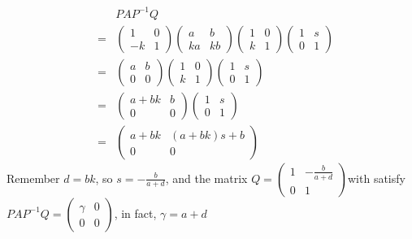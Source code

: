 \begin{eqnarray*}
  & & PAP^{-1}Q \\
  &=& \left(\begin{array}{cc}
    1 & 0 \\
    -k & 1
  \end{array}\right)\left(\begin{array}{cc}
    a & b \\
    ka & kb
  \end{array}\right)\left(\begin{array}{cc}
    1 & 0 \\
    k & 1
  \end{array}\right)\left(\begin{array}{cc}
    1 & s \\
    0 & 1
  \end{array}\right) \\
  &=& \left(\begin{array}{cc}
    a & b \\
    0 & 0
  \end{array}\right)\left(\begin{array}{cc}
    1 & 0 \\
    k & 1
  \end{array}\right)\left(\begin{array}{cc}
    1 & s \\
    0 & 1
  \end{array}\right) \\
  &=& \left(\begin{array}{cc}
    a + bk & b \\
    0 & 0
  \end{array}\right)\left(\begin{array}{cc}
    1 & s \\
    0 & 1
  \end{array}\right) \\
  &=& \left(\begin{array}{cc}
    a + bk & (a+bk)s + b \\
    0 & 0
  \end{array}\right)
\end{eqnarray*}
Remember $ d = bk $, so $ s = -\frac{b}{a + d} $, and the matrix $ Q = \left(\begin{array}{cc}
    1 & -\frac{b}{a+d} \\
    0 & 1
  \end{array}\right) $with satisfy $ PAP^{-1}Q = \left(\begin{array}{cc}
    \gamma & 0 \\
    0 & 0
  \end{array}\right) $, in fact, $ \gamma = a + d $
